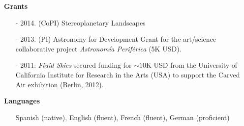 \documentclass[letterpaper,11pt,onecolumn]{article}
\begin{document}
{\bf Grants}
\begin{itemize}
\item[-] 2014. (CoPI) Stereoplanetary Landscapes
\item[-] 2013. (PI) Astronomy for Development Grant for the art/science collaborative project \emph{Astronom\'ia Perif\'erica} (5K USD). 
\item [-] 2011: {\it Fluid Skies} secured funding for $\sim 10$K USD
  from the University of California Institute for Research in the Arts
  (USA) to support the Carved Air exhibition (Berlin, 2012).
\end{itemize}


{\bf Languages}
\begin{itemize}
\item[]Spanish (native), English (fluent), French (fluent), German (proficient)
\end{itemize}
\end{document}
